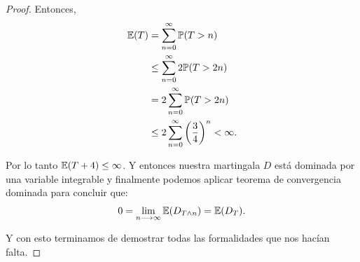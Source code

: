 \begin{proof}
		Entonces,
		\begin{align}
			\mathbb{E}(T) 	&= 		\sum_{n=0}^\infty \mathbb{P}(T > n) \\
					&\leq 	\sum_{n=0}^\infty 2\mathbb{P}(T > 2n) \\
					&= 		2 \sum_{n=0}^\infty \mathbb{P}(T > 2n) \\
					&\leq 	2 \sum_{n=0}^\infty \bigg(\frac{3}{4}\bigg)^{n} < \infty.
		\end{align}
		
		Por lo tanto $\mathbb{E}(T + 4) \leq \infty$. Y entonces nuestra martingala $D$ está dominada por una variable integrable y finalmente
		podemos aplicar teorema de convergencia dominada para concluir que:
		\begin{align}
			0 = \lim_{n \longrightarrow \infty} \mathbb{E}(D_{T \wedge n}) = \mathbb{E}(D_T).
		\end{align}
		
		Y con esto terminamos de demostrar todas las formalidades que nos hacían falta.
\end{proof}